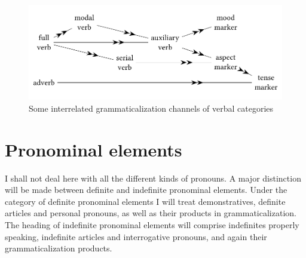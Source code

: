 
 
 
 


\begin{figure}

\includegraphics[width=.9\textwidth]{figures/2-someintverbcat.pdf}
\caption{Some interrelated grammaticalization channels of verbal categories}\label{fig:interrelated}
\end{figure}


\section{Pronominal elements}\label{sec:3.2}

I shall not deal here with all the different kinds of pronouns. A major distinction will be made between definite and indefinite pronominal elements. Under the category of definite pronominal elements I will treat demonstratives, definite articles and personal pronouns, as well as their products in grammaticalization. The heading of indefinite pronominal elements will comprise indefinites properly speaking, indefinite articles and interrogative pronouns, and again their grammaticalization products.

